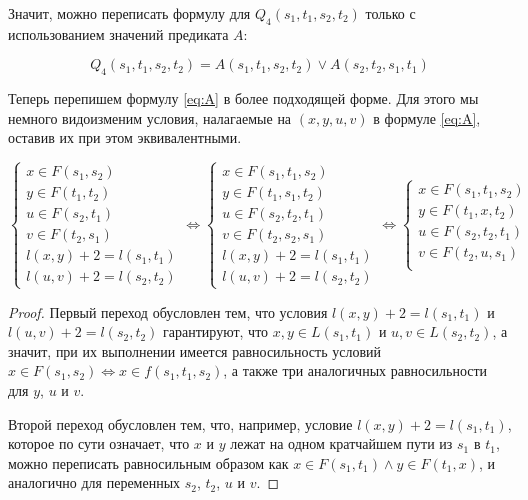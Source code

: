 Значит, можно переписать формулу для $Q_4(s_1, t_1, s_2, t_2)$ только с использованием значений предиката $A$:

\begin{equation} \label{eq:Q4A}
Q_4(s_1, t_1, s_2, t_2) = A(s_1, t_1, s_2, t_2) \vee A(s_2, t_2, s_1, t_1)
\end{equation}

Теперь перепишем формулу \eqref{eq:A} в более подходящей форме. Для этого мы немного видоизменим условия, налагаемые на $(x, y, u, v)$ в формуле \eqref{eq:A}, оставив их при этом эквивалентными.

\begin{proposition}

\begin{equation}
\begin{cases}
    x \in F(s_1, s_2)\\ 
    y \in F(t_1, t_2)\\ 
    u \in F(s_2, t_1)\\ 
    v \in F(t_2, s_1)\\ 
    l(x, y) + 2 = l(s_1, t_1)\\ 
    l(u, v) + 2 = l(s_2, t_2)
\end{cases} \Longleftrightarrow
\begin{cases}
    x \in F(s_1, t_1, s_2)\\ 
    y \in F(t_1, s_1, t_2)\\ 
    u \in F(s_2, t_2, t_1)\\ 
    v \in F(t_2, s_2, s_1)\\ 
    l(x, y) + 2 = l(s_1, t_1)\\ 
    l(u, v) + 2 = l(s_2, t_2)
\end{cases} \Longleftrightarrow
\begin{cases}
    x \in F(s_1, t_1, s_2)\\ 
    y \in F(t_1, x, t_2)\\ 
    u \in F(s_2, t_2, t_1)\\ 
    v \in F(t_2, u, s_1)\\ 
\end{cases}
\end{equation}
\end{proposition}
\begin{proof}
Первый переход обусловлен тем, что условия $l(x, y) + 2 = l(s_1, t_1)$ и $l(u, v) + 2 = l(s_2, t_2)$ гарантируют, что $x, y \in L(s_1, t_1)$ и $u, v \in L(s_2, t_2)$, а значит, при их выполнении имеется равносильность условий $x \in F(s_1, s_2) \Leftrightarrow x \in f(s_1, t_1, s_2)$, а также три аналогичных равносильности для $y$, $u$ и $v$.

Второй переход обусловлен тем, что, например, условие $l(x, y) + 2 = l(s_1, t_1)$, которое по сути означает, что $x$ и $y$ лежат на одном кратчайшем пути из $s_1$ в $t_1$, можно переписать равносильным образом как $x \in F(s_1, t_1) \wedge y \in F(t_1, x)$, и аналогично для переменных $s_2$, $t_2$, $u$ и $v$.
\end{proof}

